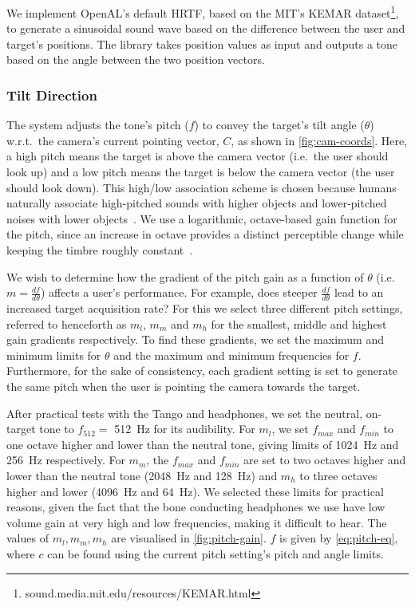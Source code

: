 \documentclass[sigconf, review=true, screen=true, anonymous=true]{acmart}
\begin{document}
We implement OpenAL's default HRTF, based on the MIT's KEMAR dataset\footnote{sound.media.mit.edu/resources/KEMAR.html}, to generate a sinusoidal sound wave based on the difference between the user and target's positions.
The library takes position values as input and outputs a tone based on the angle between the two position vectors. 

\subsubsection{Tilt Direction}

The system adjusts the tone's pitch ($f$) to convey the target's tilt angle ($\theta$) w.r.t.\ the camera's current pointing vector, $C$, as shown in \cref{fig:cam-coords}. 
Here, a high pitch means the target is above the camera vector (i.e.\ the user should look up) and a low pitch means the target is below the camera vector (the user should look down).
This high/low association scheme is chosen because humans naturally associate high-pitched sounds with higher objects and lower-pitched noises with lower objects~\cite{pratt1930spatial, blauert1997spatial}.
We use a logarithmic, octave-based gain function for the pitch, since an increase in octave provides a distinct perceptible change while keeping the timbre roughly constant~\cite{shepard1964circularity}.

We wish to determine how the gradient of the pitch gain as a function of $\theta$ (i.e.\ $m = \frac{df}{d\theta}$) affects a user's performance.
For example, does steeper $\frac{df}{d\theta}$ lead to an increased target acquisition rate?
For this we select three different pitch settings, referred to henceforth as $m_l$, $m_m$ and $m_h$ for the smallest, middle and highest gain gradients respectively. 
To find these gradients, we set the maximum and minimum limits for $\theta$ and the maximum and minimum frequencies for $f$.
Furthermore, for the sake of consistency, each gradient setting is set to generate the same pitch when the user is pointing the camera towards the target. 

After practical tests with the Tango and headphones, we set the neutral, on-target tone to $f_{512} =$ \SI{512}{\hertz} for its audibility.
For $m_l$, we set $f_{max}$ and $f_{min}$ to one octave higher and lower than the neutral tone, giving limits of \SI{1024}{\hertz} and \SI{256}{\hertz} respectively.
For $m_m$, the $f_{max}$ and $f_{min}$ are set to two octaves higher and lower than the neutral tone (\SI{2048}{\hertz} and \SI{128}{\hertz}) and $m_h$ to three octaves higher and lower (\SI{4096}{\hertz} and \SI{64}{\hertz}).
We selected these limits for practical reasons, given the fact that the bone conducting headphones we use have low volume gain at very high and low frequencies, making it difficult to hear. 
The values of $m_l, m_m, m_h$ are visualised in \cref{fig:pitch-gain}.
$f$ is given by \cref{eq:pitch-eq}, where $c$ can be found using the current pitch setting's pitch and angle limits.
\end{document}
